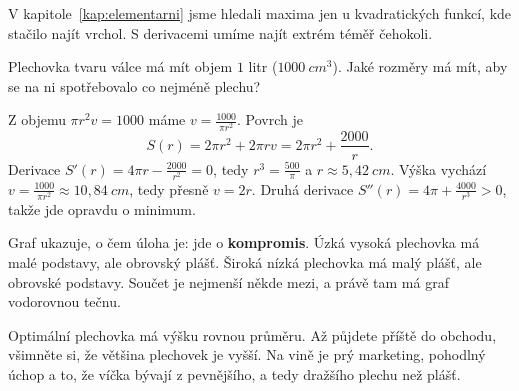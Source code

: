 V kapitole~\ref{kap:elementarni} jsme hledali maxima jen u kvadratických funkcí, kde stačilo najít vrchol. S derivacemi umíme najít extrém téměř čehokoli.

\begin{example}
  Plechovka tvaru válce má mít objem $1$ litr ($1000\ \si{cm^3}$). Jaké rozměry má mít, aby se na ni spotřebovalo co nejméně plechu?

  Z objemu $\pi r^2v = 1000$ máme $v = \frac{1000}{\pi r^2}$. Povrch je
  \begin{equation*}
    S(r) = 2\pi r^2 + 2\pi rv = 2\pi r^2 + \frac{2000}{r}.
  \end{equation*}
  Derivace $S'(r) = 4\pi r - \frac{2000}{r^2} = 0$, tedy $r^3 = \frac{500}{\pi}$ a $r\approx 5{,}42\ \si{cm}$. Výška vychází $v = \frac{1000}{\pi r^2}\approx 10{,}84\ \si{cm}$, tedy přesně $v = 2r$. Druhá derivace $S''(r) = 4\pi + \frac{4000}{r^3} > 0$, takže jde opravdu o minimum.

  \begin{center}
  \end{center}
  Graf ukazuje, o čem úloha je: jde o \textbf{kompromis}. Úzká vysoká plechovka má malé podstavy, ale obrovský plášť. Široká nízká plechovka má malý plášť, ale obrovské podstavy. Součet je nejmenší někde mezi, a právě tam má graf vodorovnou tečnu.

  Optimální plechovka má výšku rovnou průměru. Až půjdete příště do obchodu, všimněte si, že většina plechovek je vyšší. Na vině je prý marketing, pohodlný úchop a to, že víčka bývají z pevnějšího, a tedy dražšího plechu než plášť.
\end{example}

